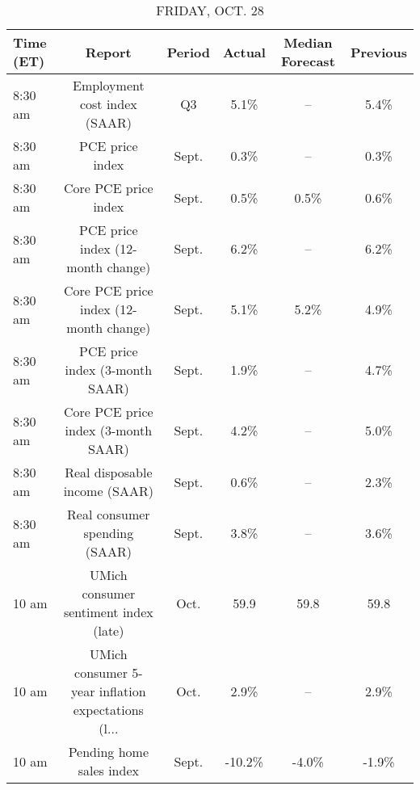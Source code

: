 \documentclass{article}%
\begin{document}
\begin{table}[htbp]%
\caption{FRIDAY, OCT. 28}%
\centering%
\begin{adjustbox}{width=1\textwidth}%
\begin{tabular}{lccccc}
\toprule
Time (ET) &                                             Report & Period & Actual & Median Forecast & Previous \\
\midrule
  8:30 am &                       Employment cost index (SAAR) &     Q3 &   5.1\% &              -- &     5.4\% \\
  8:30 am &                                    PCE price index &  Sept. &   0.3\% &              -- &     0.3\% \\
  8:30 am &                               Core PCE price index &  Sept. &   0.5\% &            0.5\% &     0.6\% \\
  8:30 am &                  PCE price index (12-month change) &  Sept. &   6.2\% &              -- &     6.2\% \\
  8:30 am &             Core PCE price index (12-month change) &  Sept. &   5.1\% &            5.2\% &     4.9\% \\
  8:30 am &                     PCE price index (3-month SAAR) &  Sept. &   1.9\% &              -- &     4.7\% \\
  8:30 am &                Core PCE price index (3-month SAAR) &  Sept. &   4.2\% &              -- &     5.0\% \\
  8:30 am &                      Real disposable income (SAAR) &  Sept. &   0.6\% &              -- &     2.3\% \\
  8:30 am &                      Real consumer spending (SAAR) &  Sept. &   3.8\% &              -- &     3.6\% \\
    10 am &              UMich consumer sentiment index (late) &   Oct. &   59.9 &            59.8 &     59.8 \\
    10 am & UMich consumer 5-year inflation expectations (l... &   Oct. &   2.9\% &              -- &     2.9\% \\
    10 am &                           Pending home sales index &  Sept. & -10.2\% &           -4.0\% &    -1.9\% \\
\bottomrule
\end{tabular}
%
\end{adjustbox}%
\end{table}
\end{document}

